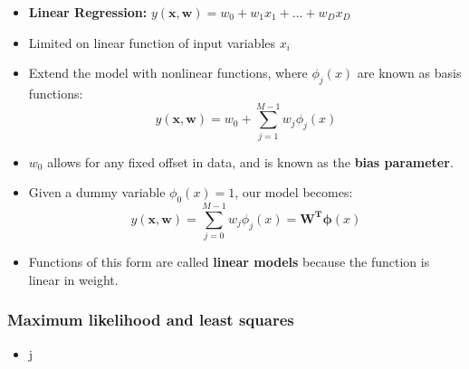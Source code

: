 \begin{itemize}[--]
	\item \textbf{Linear Regression:} $y(\mathbf{x}, \mathbf{w})=w_0+w_1 x_1+\ldots +w_D x_D$
	\item Limited on linear function of input variables $x_i$
	\item Extend the model with nonlinear functions, where $\phi_j (x)$ are known as basis functions:
		$$y(\mathbf{x}, \mathbf{w})=w_0 +\sum_{j=1}^{M-1}w_j\phi_j (x)$$
	\item $w_0$ allows for any fixed offset in data, and is known as the \textbf{bias parameter}.
	\item Given a dummy variable $\phi_0 (x)=1$, our model becomes:
		$$y(\mathbf{x}, \mathbf{w})=\sum_{j=0}^{M-1}w_j\phi_j (x)=\mathbf{W}^\mathbf{T} \mathbf{\phi} (x)$$
	\item Functions of this form are called \textbf{linear models} because the function is linear in weight.
\end{itemize}

\subsubsection{Maximum likelihood and least squares}
\begin{itemize}[--]
	\item j
\end{itemize}
